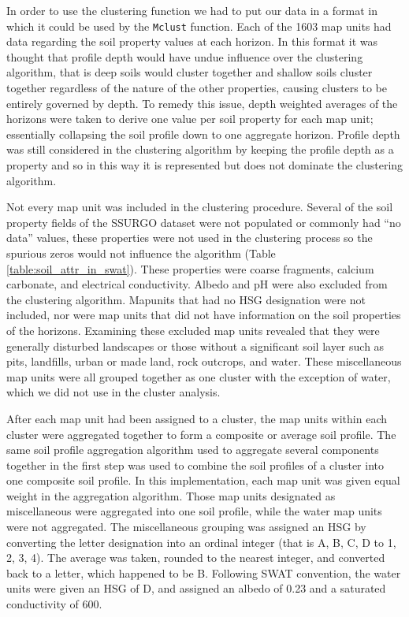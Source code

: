 In order to use the clustering function we had to put our data in a format in which it could 
be used by the \texttt{Mclust} function. Each of the 1603 map units had data regarding the soil property values at each
horizon. In this format it was thought that profile depth would have undue influence over the clustering algorithm, that is deep soils would cluster together and shallow soils cluster together regardless of the nature of the other properties, causing clusters to be entirely governed by
depth. To remedy this issue, depth weighted averages of the horizons were taken
to derive one value per soil property for each map unit; essentially collapsing
the soil profile down to one aggregate horizon. Profile depth was still
considered in the clustering algorithm by keeping the profile depth as a
property and so in this way it is represented but does not dominate the clustering
algorithm.

Not every map unit was included in the clustering procedure. Several of the soil property fields of the SSURGO dataset were not populated or commonly had ``no data'' values, these properties were not used in the
clustering process so the spurious zeros would not influence the algorithm (Table \ref{table:soil_attr_in_swat}). These properties were coarse fragments, calcium carbonate, and electrical conductivity. Albedo and pH were also excluded from the clustering algorithm. Mapunits that had no HSG designation were not included, nor were map units that did not have information on the soil properties of the horizons. Examining these excluded map units revealed that they were generally disturbed landscapes or those without a significant soil layer such as pits, landfills, urban or made land, rock outcrops, and water. These miscellaneous map units were all grouped together as one cluster with the exception of water, which we did not use in the cluster analysis.

After each map unit had been assigned to a cluster, the map units within each cluster were
aggregated together to form a composite or average soil profile. 
The same soil profile aggregation algorithm \citep{beaudette_algorithms_2013}
used to aggregate several components together in the first step was used to combine the soil profiles of a cluster into one
composite soil profile. In this implementation, each map unit was given equal
weight in the aggregation algorithm. Those map units designated as miscellaneous
were aggregated into one soil profile, while the
water map units were not aggregated. The miscellaneous grouping was assigned an
HSG by converting the letter designation into an ordinal
integer (that is A, B, C, D to 1, 2, 3, 4). The average was taken, rounded to
the nearest integer, and converted back to a letter, which happened to be B. Following SWAT convention, the water units
were given an HSG of D, and assigned an albedo of 0.23 and a saturated conductivity
of 600.

